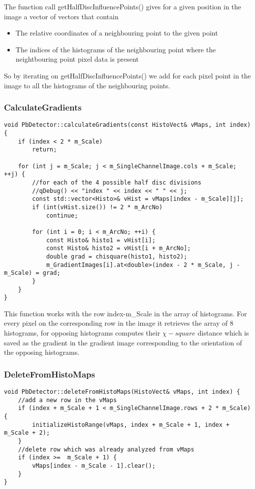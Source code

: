 The function call getHalfDiscInfluencePoints() gives for a given position in the image a vector of vectors that contain
\begin{itemize}
	\item The relative coordinates of a neighbouring point to the given point
	\item The indices of the histograms of the neighbouring point where the neightbouring point pixel data is present
\end{itemize}

So by iterating on getHalfDiscInfluencePoints() we add for each pixel point in the image to all the histograms of the neighbouring points.

\subsubsection{CalculateGradients}

\begin{lstlisting}
void PbDetector::calculateGradients(const HistoVect& vMaps, int index) {
	if (index < 2 * m_Scale)
		return;
	
	for (int j = m_Scale; j < m_SingleChannelImage.cols + m_Scale; ++j) {
		//for each of the 4 possible half disc divisions
		//qDebug() << "index " << index << " " << j;
		const std::vector<Histo>& vHist = vMaps[index - m_Scale][j];
		if (int(vHist.size()) != 2 * m_ArcNo)
			continue;
		
		for (int i = 0; i < m_ArcNo; ++i) {
			const Histo& histo1 = vHist[i];
			const Histo& histo2 = vHist[i + m_ArcNo];
			double grad = chisquare(histo1, histo2);
			m_GradientImages[i].at<double>(index - 2 * m_Scale, j - m_Scale) = grad;
		}
	}
}
\end{lstlisting}

This function works with the row index-m\_Scale in the array of histograms. For every pixel on the corresponding row in the image it retrieves the array of 8 histograms, for opposing histograms computes their $\chi -square$ distance which is saved as the gradient in the gradient image corresponding to the orientation of the opposing histograms.

\subsubsection{DeleteFromHistoMaps}

\begin{lstlisting}
void PbDetector::deleteFromHistoMaps(HistoVect& vMaps, int index) {
	//add a new row in the vMaps
	if (index + m_Scale + 1 < m_SingleChannelImage.rows + 2 * m_Scale) {
		initializeHistoRange(vMaps, index + m_Scale + 1, index + m_Scale + 2);
	}
	//delete row which was already analyzed from vMaps
	if (index >=  m_Scale + 1) {
		vMaps[index - m_Scale - 1].clear();
	}
}
\end{lstlisting}